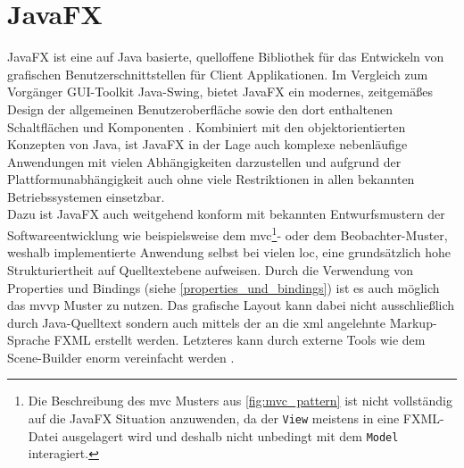 \section{JavaFX}
\label{javafx}
\noindent JavaFX ist eine auf Java basierte, quelloffene Bibliothek für das Entwickeln von grafischen Benutzerschnittstellen für Client Applikationen. Im Vergleich zum Vorgänger GUI-Toolkit Java-Swing, bietet JavaFX ein modernes, zeitgemäßes Design der allgemeinen Benutzeroberfläche sowie den dort enthaltenen Schaltflächen und Komponenten \cite{Sharan2015}. Kombiniert mit den objektorientierten Konzepten von Java, ist JavaFX in der Lage auch komplexe nebenläufige Anwendungen mit vielen Abhängigkeiten darzustellen und aufgrund der Plattformunabhängigkeit auch ohne viele Restriktionen in allen bekannten Betriebssystemen einsetzbar.\\
Dazu ist JavaFX auch weitgehend konform mit bekannten Entwurfsmustern der Softwareentwicklung wie beispielsweise dem \ac{mvc}\footnote{Die Beschreibung des \ac{mvc} Musters aus \autoref{fig:mvc_pattern} ist nicht vollständig auf die JavaFX Situation anzuwenden, da der  \texttt{View} meistens in eine FXML-Datei ausgelagert wird und deshalb nicht unbedingt mit dem \texttt{Model} interagiert.}- oder dem Beobachter-Muster, weshalb implementierte Anwendung selbst bei vielen \ac{loc}, eine grundsätzlich hohe Strukturiertheit auf Quelltextebene aufweisen. Durch die Verwendung von Properties und Bindings (siehe \autoref{properties_und_bindings}) ist es auch möglich das \ac{mvvp} Muster zu nutzen. Das grafische Layout kann dabei nicht ausschließlich durch Java-Quelltext sondern auch mittels der an die \ac{xml} angelehnte Markup-Sprache FXML erstellt werden. Letzteres kann durch externe Tools wie dem Scene-Builder enorm vereinfacht werden \cite{Vos2018}.

